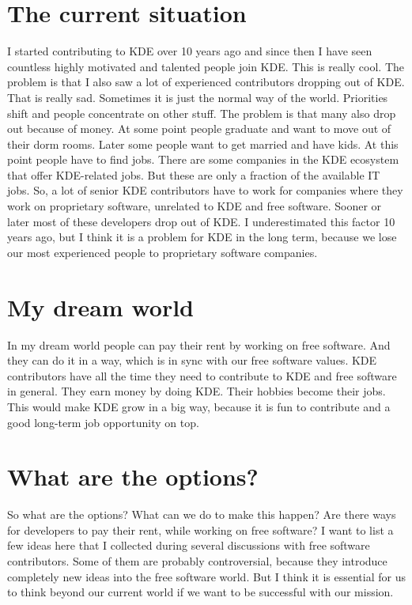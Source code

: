 \section*{The current situation}

I started contributing to KDE over 10 years ago and since then I have seen countless highly motivated and talented people join KDE. This is really cool. The problem is that I also saw a lot of experienced contributors dropping out of KDE. That is really sad. Sometimes it is just the normal way of the world. Priorities shift and people concentrate on other stuff. The problem is that many also drop out because of money. At some point people graduate and want to move out of their dorm rooms. Later some people want to get married and have kids. At this point people have to find jobs. There are some companies in the KDE ecosystem that offer KDE-related jobs. But these are only a fraction of the available IT jobs. So, a lot of senior KDE contributors have to work for companies where they  work on proprietary software, unrelated to KDE and free software. Sooner or later most of these developers drop out of KDE.
I underestimated this factor 10 years ago, but I think it is a problem for KDE in the long term, because we lose our most experienced people to proprietary software companies.

\section*{My dream world}

In my dream world people can pay their rent by working on free software. And they can do it in a way, which is in sync with our free software values. KDE contributors have all the time they need to contribute to KDE and free software in general. They earn money by doing KDE. Their hobbies become their jobs. This would make KDE grow in a big way, because it is fun to contribute and a good long-term job opportunity on top.  

\section*{What are the options?}

So what are the options? What can we do to make this happen? Are there ways for developers to pay their rent, while working on free software? I want to list a few ideas here that I collected during several discussions with free software contributors. Some of them are probably controversial, because they introduce completely new ideas into the free software world. But I think it is essential for us to think beyond our current world if we want to be successful with our mission.  

